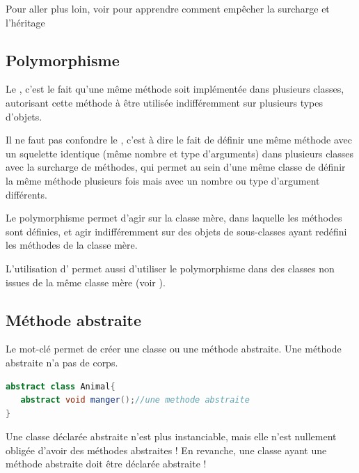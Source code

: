 \documentclass[a4paper,twoside]{article}
\begin{document}
Pour aller plus loin, voir  pour apprendre comment empêcher la surcharge et l'héritage

\subsection{Polymorphisme}
Le , c'est le fait qu'une même méthode soit implémentée dans plusieurs classes, autorisant cette méthode à être utilisée indifféremment sur plusieurs types d'objets. 

\begin{attention}
Il ne faut pas confondre le , c'est à dire le fait de définir une même méthode avec un squelette identique (même nombre et type d'arguments) dans plusieurs classes avec la surcharge de méthodes, qui permet au sein d'une même classe de définir la même méthode plusieurs fois mais avec un nombre ou type d'argument différents.
\end{attention}

Le polymorphisme permet d'agir sur la classe mère, dans laquelle les méthodes sont définies, et agir indifféremment sur des objets de sous-classes ayant redéfini les méthodes de la classe mère. 

\begin{remarque}
L'utilisation d' permet aussi d'utiliser le polymorphisme dans des classes non issues de la même classe mère (voir ).
\end{remarque}

\subsection{Méthode abstraite}\label{sec:methode_abstraite}
Le mot-clé  permet de créer une classe ou une méthode abstraite. Une méthode abstraite n'a pas de corps.

\begin{lstlisting}[language=java]
abstract class Animal{
   abstract void manger();//une methode abstraite
}
\end{lstlisting}

\begin{remarque}
Une classe déclarée abstraite n'est plus instanciable, mais elle n'est nullement obligée d'avoir des méthodes abstraites ! En revanche, une classe ayant une méthode abstraite doit être déclarée abstraite ! 
\end{remarque}
\end{document}
